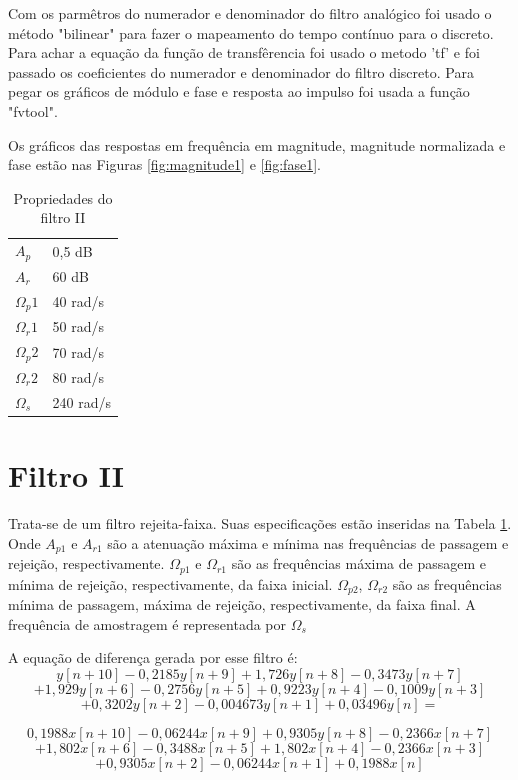 \documentclass[a4paper,10pt]{article}
\begin{document}
Com os parmêtros do numerador e denominador do filtro analógico foi usado o método "bilinear" para
fazer o mapeamento do tempo contínuo para o discreto. Para achar a equação da função de transfêrencia
foi usado o metodo 'tf' e foi passado os coeficientes do numerador e denominador do filtro discreto.
Para pegar os gráficos de módulo e fase e resposta ao impulso foi usada a função "fvtool".


Os gráficos das respostas em frequência em magnitude, magnitude normalizada e fase estão nas Figuras \ref{fig:magnitude1} e \ref{fig:fase1}.

\begin{table}[ht]
\centering
\begin{tabular}{|l|l|}

\(A_p\) 	& 0,5 dB	\\
\(A_r\) 	& 60 dB		\\
\(\Omega_p1\) 	& 40 rad/s	\\
\(\Omega_r1\) 	& 50 rad/s	\\
\(\Omega_p2\) 	& 70 rad/s	\\
\(\Omega_r2\) 	& 80 rad/s	\\
\(\Omega_s\) 	& 240 rad/s	\\

\end{tabular}
\caption{Propriedades do filtro II}
\label{tab:tabfiltro2}
\end{table}


\section{Filtro II}
Trata-se de um filtro rejeita-faixa. Suas especificações estão inseridas na Tabela \ref{tab:tabfiltro2}. Onde \(A_{p1}\) e \(A_{r1}\) são a atenuação máxima e mínima nas frequências de passagem e rejeição, respectivamente. \(\Omega_{p1}\) e \(\Omega_{r1}\) são as frequências  máxima de passagem e mínima de rejeição, respectivamente, da faixa inicial. \(\Omega_{p2}\), \(\Omega_{r2}\) são as frequências mínima de passagem, máxima de rejeição, respectivamente, da faixa final.
A frequ\^encia de amostragem \'e representada por \(\Omega_s\)

A equação de diferença gerada por esse filtro é: 
\[        y[n+10]	- 0,2185y[n+9] 		+ 1,726y[n+8] 		- 0,3473y[n+7]\]
\[+  1,929y[n+6] 	- 0,2756y[n+5] 		+ 0,9223y[n+4] 		- 0,1009y[n+3]\]
\[+ 0,3202y[n+2] 	- 0,004673y[n+1] 	+ 0,03496y[n] =		      \]

\[  0,1988x[n+10] 	- 0,06244x[n+9] 	+ 0,9305y[n+8] 		- 0,2366x[n+7]\]
\[+  1,802x[n+6] 	- 0,3488x[n+5] 		+ 1,802x[n+4] 		- 0,2366x[n+3]\]
\[+ 0,9305x[n+2] 	- 0,06244x[n+1] 	+ 0,1988x[n]			      \] 
\end{document}
